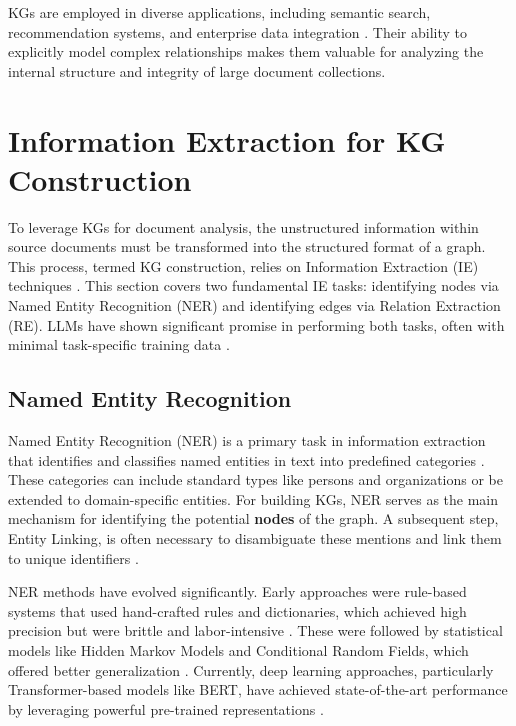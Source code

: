 KGs are employed in diverse applications, including semantic search, recommendation systems, and enterprise data integration \parencite{RefWorks:RefID:102-hogan2021knowledge, RefWorks:RefID:118-ji2022survey, RefWorks:RefID:120-fensel2020knowledge}. Their ability to explicitly model complex relationships makes them valuable for analyzing the internal structure and integrity of large document collections.

\section{Information Extraction for KG Construction}
To leverage KGs for document analysis, the unstructured information within source documents must be transformed into the structured format of a graph. This process, termed KG construction, relies on Information Extraction (IE) techniques \parencite{RefWorks:RefID:121-zhong2024comprehensive, RefWorks:RefID:122-kolluru2020imojie}. This section covers two fundamental IE tasks: identifying nodes via Named Entity Recognition (NER) and identifying edges via Relation Extraction (RE). LLMs have shown significant promise in performing both tasks, often with minimal task-specific training data \parencite{RefWorks:RefID:107-benjira2025automated}.

\subsection{Named Entity Recognition}
Named Entity Recognition (NER) is a primary task in information extraction that identifies and classifies named entities in text into predefined categories \parencite{RefWorks:RefID:4-al-moslmi2020named}. These categories can include standard types like persons and organizations or be extended to domain-specific entities. For building KGs, NER serves as the main mechanism for identifying the potential \textbf{nodes} of the graph. A subsequent step, Entity Linking, is often necessary to disambiguate these mentions and link them to unique identifiers \parencite{RefWorks:RefID:5-chaurasiya2022entity}.

NER methods have evolved significantly. Early approaches were rule-based systems that used hand-crafted rules and dictionaries, which achieved high precision but were brittle and labor-intensive \parencite{RefWorks:RefID:126-nadeau2007survey, RefWorks:RefID:127-grishman1996messageunderstanding}. These were followed by statistical models like Hidden Markov Models and Conditional Random Fields, which offered better generalization \parencite{RefWorks:RefID:128-lafferty2001conditional}. Currently, deep learning approaches, particularly Transformer-based models like BERT, have achieved state-of-the-art performance by leveraging powerful pre-trained representations \parencite{RefWorks:RefID:4-al-moslmi2020named, RefWorks:RefID:57-carbonell2020named}.

